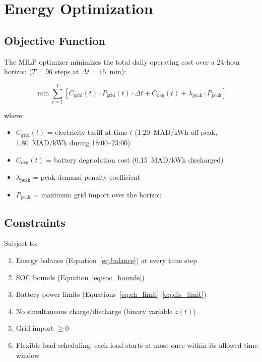 \chapter{Energy Optimization}
\label{ch:optimization}

\section{Objective Function}

The MILP optimizer minimizes the total daily operating cost over a 24-hour horizon ($T = 96$ steps at $\Delta t = 15$~min):

\begin{equation}
    \min \sum_{t=1}^{T} \left[ C_{\text{grid}}(t) \cdot P_{\text{grid}}(t) \cdot \Delta t + C_{\text{deg}}(t) + \lambda_{\text{peak}} \cdot P_{\text{peak}} \right]
    \label{eq:objective}
\end{equation}

where:
\begin{itemize}[nosep]
    \item $C_{\text{grid}}(t)$ = electricity tariff at time $t$ (1.20~MAD/kWh off-peak, 1.80~MAD/kWh during 18:00--23:00)
    \item $C_{\text{deg}}(t)$ = battery degradation cost (0.15~MAD/kWh discharged)
    \item $\lambda_{\text{peak}}$ = peak demand penalty coefficient
    \item $P_{\text{peak}}$ = maximum grid import over the horizon
\end{itemize}

\section{Constraints}

Subject to:
\begin{enumerate}[nosep]
    \item Energy balance (Equation~\ref{eq:balance}) at every time step
    \item SOC bounds (Equation~\ref{eq:soc_bounds})
    \item Battery power limits (Equations~\ref{eq:ch_limit}--\ref{eq:dis_limit})
    \item No simultaneous charge/discharge (binary variable $z(t)$)
    \item Grid import $\geq 0$
    \item Flexible load scheduling: each load starts at most once within its allowed time window
\end{enumerate}


